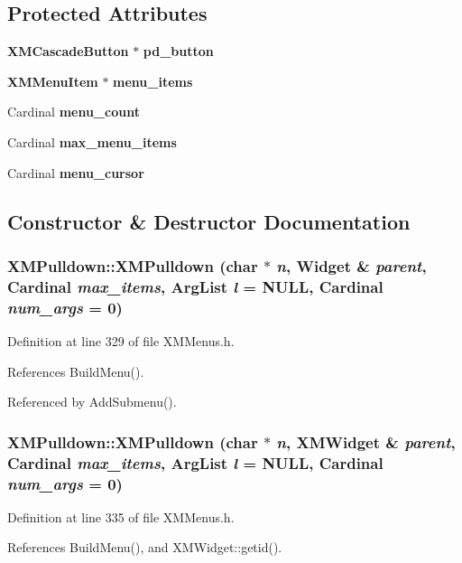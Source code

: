 \subsection*{Protected Attributes}
\begin{CompactItemize}
\item 
{\bf XMCascade\-Button} $\ast$ {\bf pd\_\-button}
\item 
{\bf XMMenu\-Item} $\ast$ {\bf menu\_\-items}
\item 
Cardinal {\bf menu\_\-count}
\item 
Cardinal {\bf max\_\-menu\_\-items}
\item 
Cardinal {\bf menu\_\-cursor}
\end{CompactItemize}


\subsection{Constructor \& Destructor Documentation}
\subsubsection{\setlength{\rightskip}{0pt plus 5cm}XMPulldown::XMPulldown (char $\ast$ {\em n}, Widget \& {\em parent}, Cardinal {\em max\_\-items}, Arg\-List {\em l} = NULL, Cardinal {\em num\_\-args} = 0)\hspace{0.3cm}{\tt  [inline]}}\label{classXMPulldown_a0}




Definition at line 329 of file XMMenus.h.

References Build\-Menu().

Referenced by Add\-Submenu().
\subsubsection{\setlength{\rightskip}{0pt plus 5cm}XMPulldown::XMPulldown (char $\ast$ {\em n}, {\bf XMWidget} \& {\em parent}, Cardinal {\em max\_\-items}, Arg\-List {\em l} = NULL, Cardinal {\em num\_\-args} = 0)\hspace{0.3cm}{\tt  [inline]}}\label{classXMPulldown_a1}




Definition at line 335 of file XMMenus.h.

References Build\-Menu(), and XMWidget::getid().
